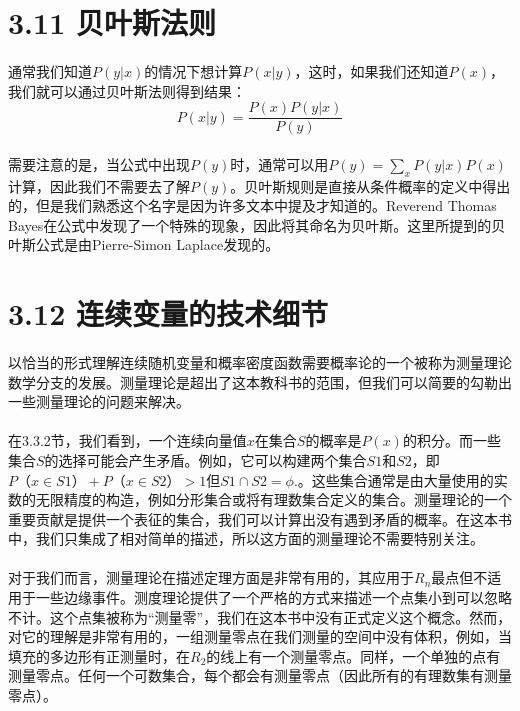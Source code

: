 \documentclass{article}
\begin{document}
    \section*{3.11 贝叶斯法则}
    \paragraph{}
    通常我们知道$P(y | x)$的情况下想计算$P(x | y)$，这时，如果我们还知道$P(x)$，我们就可以通过贝叶斯法则得到结果：
    \begin{equation}
   P(x|y)=\frac{P(x)P(y|x)}{P(y)} \tag{3.42}
   \end{equation}
   \paragraph{}
   需要注意的是，当公式中出现$P (y)$时，通常可以用$P(y)=\sum_{x}P (y|x)P(x)$计算，因此我们不需要去了解$P(y)$。贝叶斯规则是直接从条件概率的定义中得出的，但是我们熟悉这个名字是因为许多文本中提及才知道的。Reverend Thomas Bayes在公式中发现了一个特殊的现象，因此将其命名为贝叶斯。这里所提到的贝叶斯公式是由Pierre-Simon Laplace发现的。


    \section*{3.12 连续变量的技术细节}
   \paragraph{}
  以恰当的形式理解连续随机变量和概率密度函数需要概率论的一个被称为测量理论数学分支的发展。测量理论是超出了这本教科书的范围，但我们可以简要的勾勒出一些测量理论的问题来解决。
   \paragraph{}
   在3.3.2节，我们看到，一个连续向量值$x$在集合$S$的概率是$P(x)$的积分。而一些集合$S$的选择可能会产生矛盾。例如，它可以构建两个集合$S1$和$S2$，即$P（x\in S1）+ P（x\in S2）> 1$但$S1 \cap S2 = \phi$.。这些集合通常是由大量使用的实数的无限精度的构造，例如分形集合或将有理数集合定义的集合。测量理论的一个重要贡献是提供一个表征的集合，我们可以计算出没有遇到矛盾的概率。在这本书中，我们只集成了相对简单的描述，所以这方面的测量理论不需要特别关注。
   \paragraph{}
   对于我们而言，测量理论在描述定理方面是非常有用的，其应用于$R_{n}$最点但不适用于一些边缘事件。测度理论提供了一个严格的方式来描述一个点集小到可以忽略不计。这个点集被称为“测量零”，我们在这本书中没有正式定义这个概念。然而，对它的理解是非常有用的，一组测量零点在我们测量的空间中没有体积，例如，当填充的多边形有正测量时，在$R_{2}$的线上有一个测量零点。同样，一个单独的点有测量零点。任何一个可数集合，每个都会有测量零点（因此所有的有理数集有测量零点）。
\end{document}

